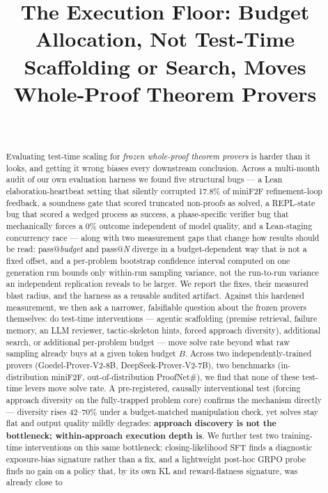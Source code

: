 \documentclass{article}
\title{The Execution Floor: Budget Allocation, Not Test-Time Scaffolding or Search,
Moves Whole-Proof Theorem Provers}
\author{%
  \todo{author list, anonymize for submission} \\
}
\begin{document}
\maketitle

\begin{abstract}
Evaluating test-time scaling for \emph{frozen whole-proof theorem provers} is harder than it looks, and
getting it wrong biases every downstream conclusion. Across a multi-month audit of our own evaluation
harness we found five structural bugs --- a Lean elaboration-heartbeat setting that silently corrupted
17.8\% of miniF2F refinement-loop feedback, a soundness gate that scored truncated non-proofs as solved,
a REPL-state bug that scored a wedged process as success, a phase-specific verifier bug that mechanically
forces a 0\% outcome independent of model quality, and a Lean-staging concurrency race --- along with two
measurement gaps that change how results should be read: pass@\emph{budget} and pass@\emph{N} diverge in
a budget-dependent way that is not a fixed offset, and a per-problem bootstrap confidence interval
computed on one generation run bounds only within-run sampling variance, not the run-to-run variance an
independent replication reveals to be larger. We report the fixes, their measured blast radius, and the
harness as a reusable audited artifact. Against this hardened measurement, we then ask a narrower,
falsifiable question about the frozen provers themselves: do test-time interventions --- agentic
scaffolding (premise retrieval, failure memory, an LLM reviewer, tactic-skeleton hints, forced approach
diversity), additional search, or additional per-problem budget --- move solve rate beyond what raw
sampling already buys at a given token budget $B$. Across two independently-trained provers
(Goedel-Prover-V2-8B, DeepSeek-Prover-V2-7B), two benchmarks (in-distribution miniF2F, out-of-distribution
ProofNet\#), we find that none of these test-time levers move solve rate. A pre-registered, causally interventional test
(forcing approach diversity on the fully-trapped problem core) confirms the mechanism directly ---
diversity rises 42--70\% under a budget-matched manipulation check, yet solves stay flat and output
quality mildly degrades: \textbf{approach discovery is not the bottleneck; within-approach execution
depth is}. We further test two training-time interventions on this same bottleneck: closing-likelihood
SFT finds a diagnostic exposure-bias signature rather than a fix, and a lightweight post-hoc GRPO probe
finds no gain on a policy that, by its own KL and reward-flatness signature, was already close to

\end{abstract}
\end{document}
